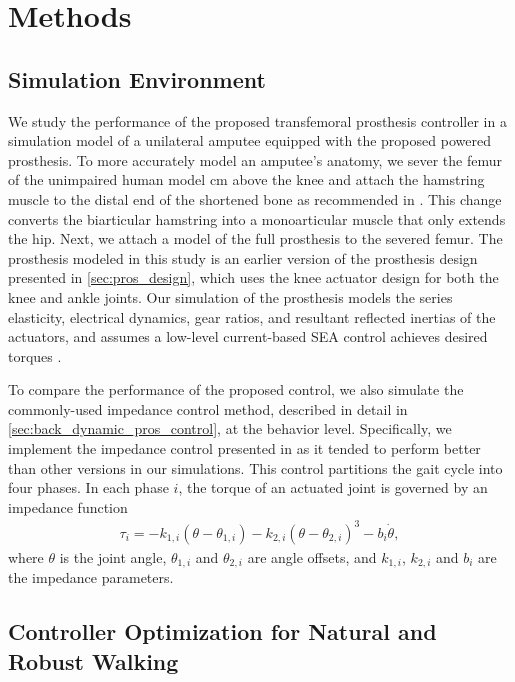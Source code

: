 \section{Methods}
\subsection{Simulation Environment}\label{sec:complete_simulation_environ}

We study the performance of the proposed transfemoral prosthesis controller in a
simulation model of a unilateral amputee equipped with the proposed powered
prosthesis. To more accurately model an amputee's anatomy, we sever the femur of
the unimpaired human model \unit[11]{cm} above the knee and attach the hamstring
muscle to the distal end of the shortened bone as recommended in
\citet{brown2012amputation}. This change converts the biarticular hamstring into
a monoarticular muscle that only extends the hip. Next, we attach a model of the
full prosthesis to the severed femur. The prosthesis modeled in this study is an
earlier version of the prosthesis design presented in
\cref{sec:pros_design}, which uses the knee actuator design for both the
knee and ankle joints. Our simulation of the prosthesis models the series
elasticity, electrical dynamics, gear ratios, and resultant reflected inertias
of the actuators, and assumes a low-level current-based SEA control achieves
desired torques \citep{pratt1995series}.

To compare the performance of the proposed control, we also simulate the
commonly-used impedance control method, described in detail in
\cref{sec:back_dynamic_pros_control},  at the behavior
level.  Specifically, we implement the impedance control presented in
\citet{sup2008design} as it tended to perform better than other versions in our
simulations. This control partitions the gait cycle into four phases. In each
phase $i$, the torque of an actuated joint is governed by an impedance function
\begin{align} 
    \tau_i = -k_{1,i} (\theta - \theta_{1,i}) - k_{2,i} 
        {(\theta - \theta_{2,i})}^3 - b_i \dot{\theta}, 
\end{align} 
where $\theta$ is the joint angle, $\theta_{1,i}$ and $\theta_{2,i}$ are angle
offsets, and $k_{1,i}$, $k_{2,i}$ and $b_i$ are the impedance parameters.  

\subsection{Controller Optimization for Natural and Robust
Walking}\label{sec:completed_comparison_opt}

